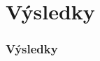 \documentclass{beamer}
\begin{document}

\section{Výsledky}
\begin{frame}
  \frametitle{Výsledky}
%    
%    

\end{frame}

% 
\end{document}
